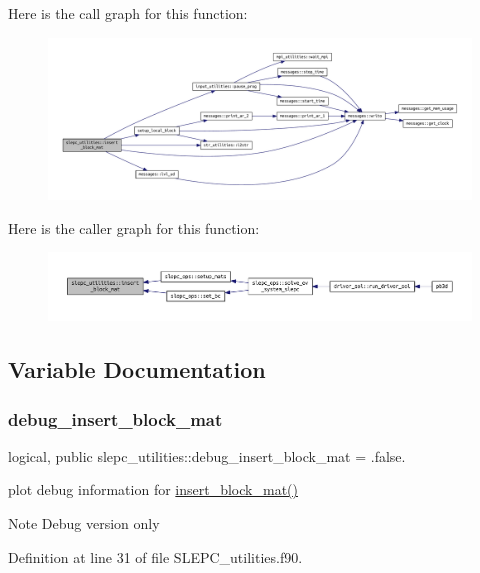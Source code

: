 Here is the call graph for this function\+:\nopagebreak
\begin{figure}[H]
\begin{center}
\leavevmode
\includegraphics[width=350pt]{namespaceslepc__utilities_aa34aa361f0bfff9621ecba179f9ed0c6_cgraph}
\end{center}
\end{figure}
Here is the caller graph for this function\+:\nopagebreak
\begin{figure}[H]
\begin{center}
\leavevmode
\includegraphics[width=350pt]{namespaceslepc__utilities_aa34aa361f0bfff9621ecba179f9ed0c6_icgraph}
\end{center}
\end{figure}


\subsection{Variable Documentation}
\mbox{\label{namespaceslepc__utilities_a5cb92553633cb22ff703286298862ac7}} 
\subsubsection{\texorpdfstring{debug\+\_\+insert\+\_\+block\+\_\+mat}{debug\_insert\_block\_mat}}
{\footnotesize\ttfamily logical, public slepc\+\_\+utilities\+::debug\+\_\+insert\+\_\+block\+\_\+mat = .false.}



plot debug information for \hyperlink{namespaceslepc__utilities_aa34aa361f0bfff9621ecba179f9ed0c6}{insert\+\_\+block\+\_\+mat()} 

\begin{DoxyNote}{Note}
Debug version only 
\end{DoxyNote}


Definition at line 31 of file S\+L\+E\+P\+C\+\_\+utilities.\+f90.

